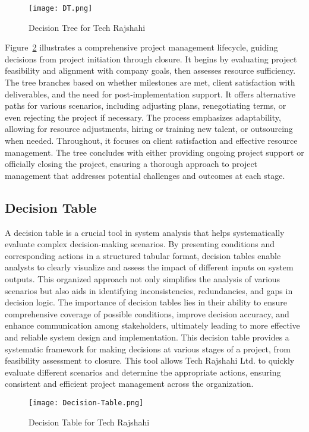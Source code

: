 \documentclass[12pt,a4paper]{article}
\begin{document}
\begin{figure}[H]
    \centering
    \texttt{[image: DT.png]}
        \caption{Decision Tree for Tech Rajshahi}
    \label{fig:decision_tree_tech}
\end{figure}

Figure~\ref{fig:decision_tree_tech} illustrates a comprehensive project management lifecycle, guiding decisions from project initiation through closure.  It begins by evaluating project feasibility and alignment with company goals, then assesses resource sufficiency.  The tree branches based on whether milestones are met, client satisfaction with deliverables, and the need for post‑implementation support.  It offers alternative paths for various scenarios, including adjusting plans, renegotiating terms, or even rejecting the project if necessary.  The process emphasizes adaptability, allowing for resource adjustments, hiring or training new talent, or outsourcing when needed.  Throughout, it focuses on client satisfaction and effective resource management.  The tree concludes with either providing ongoing project support or officially closing the project, ensuring a thorough approach to project management that addresses potential challenges and outcomes at each stage.

\subsection{Decision Table}
A decision table is a crucial tool in system analysis that helps systematically evaluate complex
decision-making scenarios. By presenting conditions and corresponding actions in a structured
tabular format, decision tables enable analysts to clearly visualize and assess the impact of different
inputs on system outputs. This organized approach not only simplifies the analysis of various
scenarios but also aids in identifying inconsistencies, redundancies, and gaps in decision logic.
The importance of decision tables lies in their ability to ensure comprehensive coverage of possible
conditions, improve decision accuracy, and enhance communication among stakeholders, ultimately
leading to more effective and reliable system design and implementation. This decision table
provides a systematic framework for making decisions at various stages of a project, from feasibility
assessment to closure. This tool allows Tech Rajshahi Ltd. to quickly evaluate different scenarios
and determine the appropriate actions, ensuring consistent and efficient project management across
the organization.
\begin{figure}[H]
    \centering
    \texttt{[image: Decision-Table.png]}
        \caption{Decision Table for Tech Rajshahi}
    \label{fig:decision_tree_tech}
\end{figure}
\end{document}
